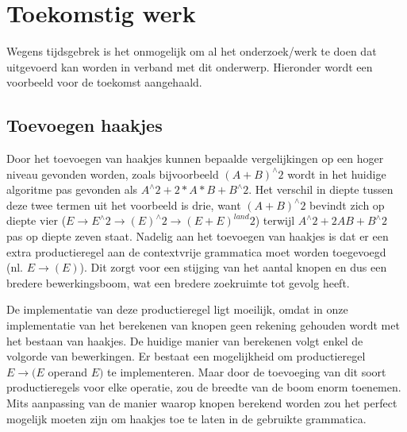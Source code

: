 \documentclass[Main.tex]{subfiles}
\begin{document}
\section{Toekomstig werk}
Wegens tijdsgebrek is het onmogelijk om al het onderzoek/werk te doen dat uitgevoerd kan worden in verband met dit onderwerp. Hieronder wordt een voorbeeld voor de toekomst aangehaald.

\subsection*{Toevoegen haakjes}
Door het toevoegen van haakjes kunnen bepaalde vergelijkingen op een hoger niveau gevonden worden, zoals bijvoorbeeld $(A+B)^{\land}2$ wordt in het huidige algoritme pas gevonden als $A^{\land}2+2 \ast A \ast B+B^{\land}2$. Het verschil in diepte tussen deze twee termen uit het voorbeeld is drie, want $(A+B)^{\land}2$ bevindt zich op diepte vier ($E \rightarrow E^{\land}2 \rightarrow (E)^{\land}2 \rightarrow (E+E)^{land}2$) terwijl $A^{\land}2+2AB+B^{\land}2$ pas op diepte zeven staat. Nadelig aan het toevoegen van haakjes is dat er een extra productieregel aan de contextvrije grammatica moet worden toegevoegd (nl. $E \rightarrow (E)$). Dit zorgt voor een stijging van het aantal knopen en dus een bredere bewerkingsboom, wat een bredere zoekruimte tot gevolg heeft. 

\par De implementatie van deze productieregel ligt moeilijk, omdat in onze implementatie van het berekenen van knopen geen rekening gehouden wordt met het bestaan van haakjes. De huidige manier van berekenen volgt enkel de volgorde van bewerkingen. Er bestaat een mogelijkheid om productieregel $E \rightarrow (E$ operand $E)$ te implementeren. Maar door de toevoeging van dit soort productieregels voor elke operatie, zou de breedte van de boom enorm toenemen. Mits aanpassing van de manier waarop knopen berekend worden zou het perfect mogelijk moeten zijn om haakjes toe te laten in de gebruikte grammatica.
\end{document}
